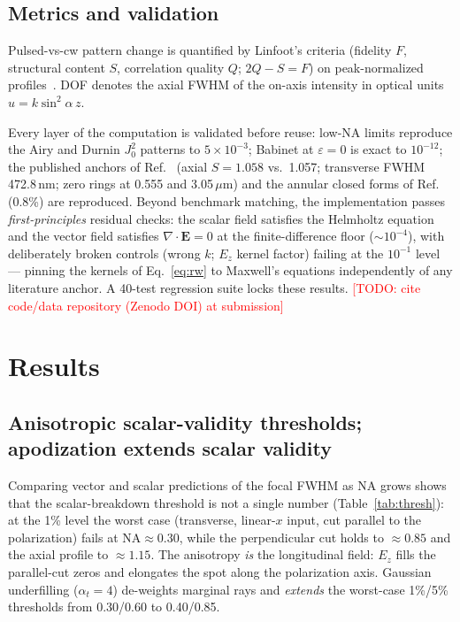 \documentclass[11pt]{article}
\newcommand{\todo}[1]{\textcolor{red}{[TODO: #1]}}
\begin{document}
\subsection{Metrics and validation}
Pulsed-vs-cw pattern change is quantified by Linfoot's criteria (fidelity $F$,
structural content $S$, correlation quality $Q$; $2Q-S=F$) on peak-normalized
profiles~\cite{Romallosa2003,Linfoot}. DOF denotes the axial FWHM of the
on-axis intensity in optical units $u=k\sin^2\!\alpha\,z$.

Every layer of the computation is validated before reuse: low-NA limits
reproduce the Airy and Durnin $J_0^2$ patterns to $5\times10^{-3}$; Babinet at
$\varepsilon{=}0$ is exact to $10^{-12}$; the published anchors of
Ref.~\cite{Romallosa2003} (axial $S=1.058$ vs.\ 1.057; transverse FWHM
472.8\,nm; zero rings at 0.555 and 3.05\,$\mu$m) and the annular closed forms
of Ref.~\cite{SheppardWilson1978} (0.8\%) are reproduced. Beyond benchmark
matching, the implementation passes \emph{first-principles} residual checks:
the scalar field satisfies the Helmholtz equation and the vector field
satisfies $\nabla\!\cdot\!\mathbf{E}=0$ at the finite-difference floor
($\sim\!10^{-4}$), with deliberately broken controls (wrong $k$; $E_z$ kernel
factor) failing at the $10^{-1}$ level --- pinning the kernels of
Eq.~\eqref{eq:rw} to Maxwell's equations independently of any literature
anchor. A 40-test regression suite locks these results.
\todo{cite code/data repository (Zenodo DOI) at submission}

\section{Results}\label{sec:results}

\subsection{Anisotropic scalar-validity thresholds; apodization extends
scalar validity}\label{sec:thresholds}
Comparing vector and scalar predictions of the focal FWHM as NA grows shows
that the scalar-breakdown threshold is not a single number
(Table~\ref{tab:thresh}): at the 1\% level the worst case (transverse,
linear-$x$ input, cut parallel to the polarization) fails at
$\mathrm{NA}\approx0.30$, while the perpendicular cut holds to ${\approx}0.85$
and the axial profile to ${\approx}1.15$. The anisotropy \emph{is} the
longitudinal field: $E_z$ fills the parallel-cut zeros and elongates the spot
along the polarization axis. Gaussian underfilling ($\alpha_t{=}4$) de-weights
marginal rays and \emph{extends} the worst-case 1\%/5\% thresholds from
0.30/0.60 to 0.40/0.85.
\end{document}
